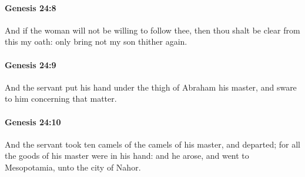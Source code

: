 		\paragraph{Genesis 24:8} %
			\label{GENESIS-24-8}

			And if the woman will not be willing to follow thee, then thou shalt be clear from this my oath: only bring not my son thither again.


		\paragraph{Genesis 24:9} %
			\label{GENESIS-24-9}

			And the servant put his hand under the thigh of Abraham his master, and sware to him concerning that matter.


		\paragraph{Genesis 24:10} %
			\label{GENESIS-24-10}

			And the servant took ten camels of the camels of his master, and departed; for all the goods of his master were in his hand: and he arose, and went to Mesopotamia, unto the city of Nahor.


